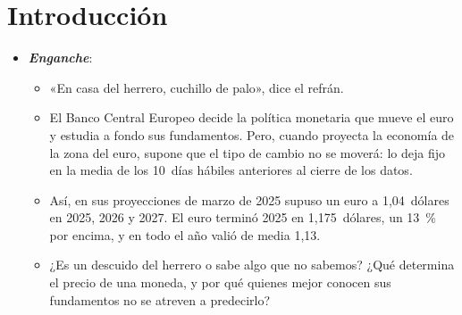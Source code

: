 \documentclass[11pt]{article}
\begin{document}
\tceetitulo

\section*{Introducción}

\begin{itemize}
\item \textbf{\emph{Enganche}}:
  \begin{itemize}
  \item «En casa del herrero, cuchillo de palo», dice el refrán.
  \item El Banco Central Europeo decide la política monetaria que mueve el euro y estudia a fondo sus fundamentos. Pero, cuando proyecta la economía de la zona del euro, supone que el tipo de cambio no se moverá: lo deja fijo en la media de los 10~días hábiles anteriores al cierre de los datos\nocite{BCE2025ProyeccionesMarzo}.
  \item Así, en sus proyecciones de marzo de 2025 supuso un euro a 1,04~dólares en 2025, 2026 y 2027. El euro terminó 2025 en 1,175~dólares, un 13~\% por encima, y en todo el año valió de media 1,13\nocite{BCE2026EURUSD}.
  \item ¿Es un descuido del herrero o sabe algo que no sabemos? ¿Qué determina el precio de una moneda, y por qué quienes mejor conocen sus fundamentos no se atreven a predecirlo?
  \end{itemize}


\end{itemize}
\end{document}

